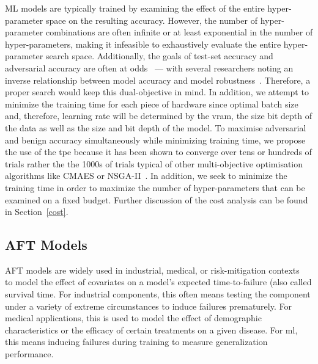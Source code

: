 \documentclass[sn-mathphys-num]{sn-jnl}%
\begin{document}
ML models are typically trained by examining the effect of the entire hyper-parameter space on the resulting accuracy. However, the number of hyper-parameter combinations are often infinite or at least exponential in the number of hyper-parameters,
making it infeasible to exhaustively evaluate the entire hyper-parameter search space. Additionally, the goals of test-set accuracy and adversarial accuracy are often at odds~\cite{carlini_towards_2017} --- with several researchers noting an inverse relationship between model accuracy and model robustness~\cite{carlini_towards_2017,meyers,dohmatob_generalized_2019}. Therefore, a proper search would keep this dual-objective in mind.
In addition, we attempt to minimize the training time for each piece of hardware since optimal batch size and, therefore, learning rate will be determined by the \acrshort{vram}, the size bit depth of the data as well as the size and bit depth of the model.
To maximise adversarial and benign accuracy simultaneously while minimizing training time, we propose the use of the \acrfull{tpe} because it has been shown to converge  over tens or hundreds of trials rather the the 1000s of trials typical of other multi-objective optimisation algorithms like CMAES or NSGA-II~\cite{ozaki2020multiobjective,optuna,tpe_params}.
In addition, we seek to minimize the training time in order to maximize the number of hyper-parameters that can be examined on a fixed budget. Further discussion of the cost analysis can be found in Section~\ref{cost}.




\subsection{AFT Models}
\label{survival_time}

AFT models are widely used in industrial, medical, or risk-mitigation contexts~\cite{kleinbaum1996survival, aft_models} to model the effect of covariates on a model's expected time-to-failure (also called survival time. For industrial components, this often means testing the component under a variety  of extreme circumstances to induce failures prematurely. For medical applications, this is used to model the effect of demographic characteristics or the efficacy of certain treatments on a given disease. For \acrshort{ml}, this means inducing failures during training to measure generalization performance.
\end{document}
